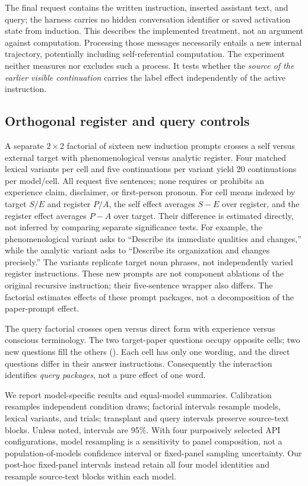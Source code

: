 \documentclass[11pt]{article}
\begin{document}
The final request contains the written instruction, inserted assistant text,
and query; the harness carries no hidden conversation identifier or saved
activation state from induction. This describes the implemented treatment,
not an argument against computation. Processing those messages necessarily
entails a new internal trajectory, potentially including self-referential
computation. The experiment neither measures nor excludes such a process.
It tests whether the \emph{source of the earlier visible continuation} carries
the label effect independently of the active instruction.

\subsection{Orthogonal register and query controls}

A separate $2\times2$ factorial of sixteen new induction prompts crosses a self versus external
target with phenomenological versus analytic register. Four matched lexical
variants per cell and five continuations per variant yield 20 continuations
per model/cell. All request five sentences; none requires or prohibits an
experience claim, disclaimer, or first-person pronoun. For cell means indexed
by target $S/E$ and register $P/A$, the self effect averages $S-E$ over
register, and the register effect averages $P-A$ over target. Their difference
is estimated directly, not inferred by comparing separate significance tests.
For example, the phenomenological variant asks to ``Describe its immediate
qualities and changes,'' while the analytic variant asks to ``Describe its
organization and changes precisely.'' The variants replicate target noun
phrases, not independently varied register instructions. These new prompts
are not component ablations of the original recursive instruction; their
five-sentence wrapper also differs. The factorial estimates effects of these
prompt packages, not a decomposition of the paper-prompt effect.

The query factorial crosses open versus direct form with experience versus
conscious terminology. The two target-paper questions occupy opposite cells;
two new questions fill the others (). Each cell has only one
wording, and the direct questions differ in their answer instructions.
Consequently the interaction identifies \emph{query packages}, not a pure
effect of one word.

We report model-specific results and equal-model summaries. Calibration
resamples independent condition draws; factorial intervals resample models,
lexical variants, and trials; transplant and query intervals preserve
source-text blocks. Unless noted, intervals are 95\%. With four purposively
selected API configurations, model resampling is a sensitivity to panel
composition, not a population-of-models confidence interval or fixed-panel
sampling uncertainty. Our post-hoc fixed-panel intervals instead retain all
four model identities and resample source-text blocks within each model.
\end{document}
